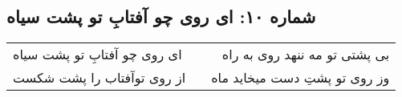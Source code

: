 \begin{center}
\section*{شماره ۱۰: ای روی چو آفتابِ تو پشت سیاه}
\label{sec:010}
\begin{longtable}{l p{0.5cm} r}
ای روی چو آفتابِ تو پشت سیاه
&&
بی پشتی تو مه ننهد روی به راه
\\
از روی توآفتاب را پشت شکست
&&
وز روی تو پشتِ دست میخاید ماه
\\
\end{longtable}
\end{center}
